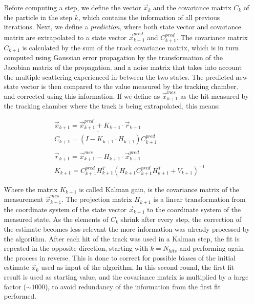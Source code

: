 Before computing a step, we define the vector $\vec{x}_k$ and the covariance matrix $C_k$ of the particle in the step $k$, which contains the information of all previous iterations. Next, we define a \textit{prediction}, where both state vector and covariance matrix are extrapolated to a state vector $\vec{x}_{k+1}^{pred}$ and $C_{k+1}^{pred}$. The covariance matrix $C_{k+1}$ is calculated by the sum of the track covariance matrix, which is in turn computed using Gaussian error propagation by the transformation of the Jacobian matrix of the propagation, and a noise matrix that takes into account the multiple scattering experienced in-between the two states. The predicted new state vector is then compared to the value measured by the tracking chamber, and corrected using this information. If we define as $\vec{x}_{k+1}^{mes}$ as the hit measured by the tracking chamber where the track is being extrapolated, this means:

\begin{equation}
  \label{eq:kf-updates}
  \begin{aligned}  
    &\underline{\vec{x}_{k+1} = \vec{x}_{k+1}^{pred} + K_{k+1} \cdot \vec{r}_{k+1}} \\
    &C_{k+1} = ( I - K_{k+1} \cdot H_{k+1} )C^{pred}_{k+1} \\
    & \\
    &\vec{r}_{k+1} = \vec{x}_{k+1}^{mes} - H_{k+1} \cdot \vec{x}_{k+1}^{pred} \\
    &K_{k+1} = C^{pred}_{k+1} H^T_{k+1}(H_{k+1}C_{k+1}^{pred}H^T_{k+1} + V_{k+1})^{-1}    
  \end{aligned}
\end{equation}

Where the matrix $K_{k+1}$ is called Kalman gain, is the covariance matrix of the measurement $\vec{x}_{k+1}^{mes}$. The projection matrix $H_{k+1}$ is a linear transformation from the coordinate system of the state vector $\vec{x}_{k+1}$ to the coordinate system of the measured state. As the elements of $C_k$ shrink after every step, the correction of the estimate becomes less relevant the more information was already processed by the algorithm. After each hit of the track was used in a Kalman step, the fit is repeated in the opposite direction, starting with $k = N_{hits}$ and performing again the process in reverse. This is done to correct for possible biases of the initial estimate $\vec{x}_0$ used as input of the algorithm. In this second round, the first fit result is used as starting value, and the covariance matrix is multiplied by a large factor ($\sim 1000$), to avoid redundancy of the information from the first fit performed.

